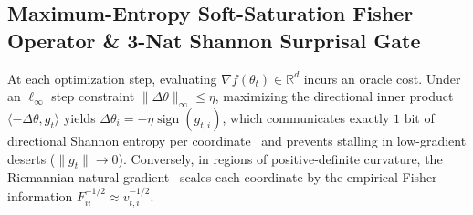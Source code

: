 \documentclass[10pt,twocolumn,letterpaper]{article}
\theoremstyle{definition}
\theoremstyle{remark}
\newcommand{\R}{\mathbb{R}}
\newcommand{\sign}{\operatorname{sign}}
\begin{document}
\subsection{Maximum-Entropy Soft-Saturation Fisher Operator \& 3-Nat Shannon Surprisal Gate}

At each optimization step, evaluating $\nabla f(\theta_t) \in \R^d$ incurs an oracle cost. Under an $\ell_\infty$ step constraint $\|\Delta\theta\|_\infty \le \eta$, maximizing the directional inner product $\langle -\Delta\theta, g_t \rangle$ yields $\Delta\theta_i = -\eta\sign(g_{t,i})$, which communicates exactly $1\text{ bit}$ of directional Shannon entropy per coordinate~\cite{shannon1948mathematical} and prevents stalling in low-gradient deserts ($\|g_t\| \to 0$). Conversely, in regions of positive-definite curvature, the Riemannian natural gradient~\cite{amari1998natural} scales each coordinate by the empirical Fisher information $F_{ii}^{-1/2} \approx v_{t,i}^{-1/2}$.
\end{document}
